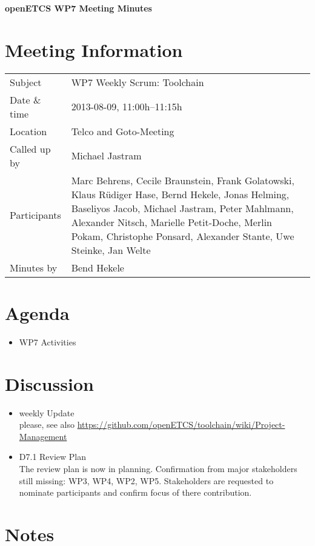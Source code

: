 \documentclass[a4paper, 11pt]{article}
\begin{document}
{\begin{center}\huge\bf openETCS WP7 Meeting Minutes\end{center}}
\section{Meeting Information}

\renewcommand{\arraystretch}{1.5}
\begin{supertabular}{m{.2\textwidth}m{.8\textwidth}}
Subject & WP7 Weekly Scrum: Toolchain\\
Date \& time & 2013-08-09, 11:00h--11:15h\\
Location & Telco and Goto-Meeting\\
Called up by & Michael Jastram\\
Participants &
Marc Behrens,
Cecile Braunstein,
Frank Golatowski,
Klaus R\"udiger Hase,
Bernd Hekele,
Jonas Helming,
Baseliyos Jacob,
Michael Jastram,
Peter Mahlmann,
Alexander Nitsch,
Marielle Petit-Doche,
Merlin Pokam,
Christophe Ponsard,
Alexander Stante,
Uwe Steinke,
Jan Welte\\


Minutes by & Bend Hekele\\

\end{supertabular}
\renewcommand{\arraystretch}{1.0}


\section{Agenda}
\begin{itemize}
\item WP7 Activities
\end{itemize}

\section{Discussion}

\begin{itemize}
\item weekly Update\\
please, see also  \url{https://github.com/openETCS/toolchain/wiki/Project-Management}
\item D7.1 Review Plan\\
The review plan is now in planning. Confirmation from major stakeholders still missing: WP3, WP4, WP2, WP5. Stakeholders are requested to nominate participants and confirm focus of there contribution.

\end{itemize}

\section{Notes}
\end{document}
